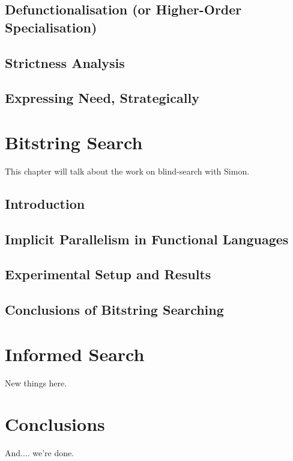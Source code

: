 \documentclass[justified, twoside, a4paper, symmetric]{tufte-book}
\begin{document}
    

    \section{Defunctionalisation (or Higher-Order Specialisation)}
    

    \section{Strictness Analysis}
    

    \section{Expressing Need, Strategically}
    
    
\chapter{Bitstring Search}

    This chapter will talk about the work on blind-search with Simon.

    \section{Introduction}
    

    \section{Implicit Parallelism in Functional Languages}
    \label{sec:blind-ParFunc}
    

    \section{Experimental Setup and Results}
    \label{sec:blind-Results}
    

    \section{Conclusions of Bitstring Searching}
    \label{sec:blind-Conclusion}
    

\chapter{Informed Search}

    New things here.
    \label{sec:informed-search}
    

\chapter{Conclusions}

    And.... we're done.

\listoftodos[Notes]

\backmatter



\end{document}
